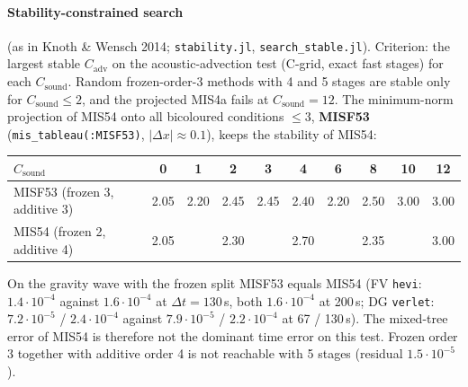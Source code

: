 \documentclass[11pt,a4paper]{article}
\newcommand{\code}[1]{\texttt{#1}}
\newcommand{\dt}{\Delta t}
\begin{document}
\paragraph{Stability-constrained search} (as in Knoth \& Wensch 2014; \code{stability.jl},
\code{search\_stable.jl}). Criterion: the largest stable $C_\mathrm{adv}$ on the acoustic-advection
test (C-grid, exact fast stages) for each $C_\mathrm{sound}$. Random frozen-order-3 methods with 4 and 5
stages are stable only for $C_\mathrm{sound}\le 2$, and the projected MIS4a fails at
$C_\mathrm{sound}=12$. The minimum-norm projection of MIS54 onto all bicoloured conditions
$\le3$, \textbf{MISF53} (\code{mis\_tableau(:MISF53)}, $|\Delta x|\approx0.1$), keeps the
stability of MIS54:
\begin{center}
\begin{tabular}{lccccccccc}
\toprule
$C_\mathrm{sound}$ & 0 & 1 & 2 & 3 & 4 & 6 & 8 & 10 & 12\\
\midrule
MISF53 (frozen 3, additive 3) & 2.05 & 2.20 & 2.45 & 2.45 & 2.40 & 2.20 & 2.50 & 3.00 & 3.00\\
MIS54 (frozen 2, additive 4) & 2.05 & & 2.30 & & 2.70 & & 2.35 & & 3.00\\
\bottomrule
\end{tabular}
\end{center}
On the gravity wave with the frozen split MISF53 equals MIS54 (FV \code{hevi}: $1.4\cdot10^{-4}$
against $1.6\cdot10^{-4}$ at $\dt=130$\,s, both $1.6\cdot10^{-4}$ at 200\,s; DG \code{verlet}: $7.2\cdot10^{-5}$ /
$2.4\cdot10^{-4}$ against $7.9\cdot10^{-5}$ / $2.2\cdot10^{-4}$ at 67 / 130\,s). The mixed-tree error of
MIS54 is therefore not the dominant time error on this test. Frozen order 3 together with additive
order 4 is not reachable with 5 stages (residual $1.5\cdot10^{-5}$).
\end{document}
